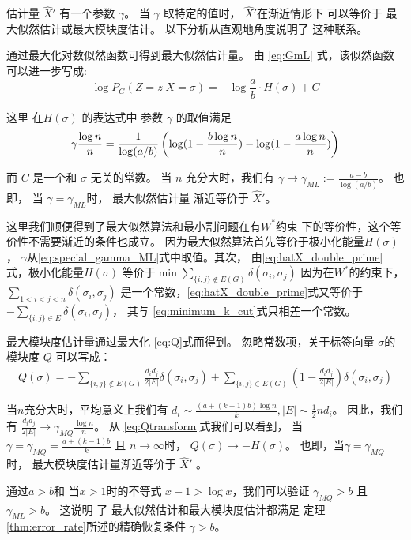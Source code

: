 估计量 $\hat{X}'$ 有一个参数 $\gamma$。
当 $\gamma$ 取特定的值时， $\hat{X}'$在渐近情形下
可以等价于 最大似然估计或最大模块度估计。
以下分析从直观地角度说明了
这种联系。

通过最大化对数似然函数可得到最大似然估计量。
由 \eqref{eq:GmL} 式，该似然函数可以进一步写成:
\begin{equation}\label{eq:PG_energy}
	\log P_G(Z=z|X=\sigma) = -\log\frac{a}{b} \cdot H(\sigma) + C
\end{equation}

这里 在$H(\sigma)$ 的表达式中 参数 $\gamma$ 的取值满足
\begin{equation}\label{eq:special_gamma_ML}
	\gamma \frac{\log n}{n} = \frac{1}{\log(a/b)}
	\left(\log (1-\frac{b \log n}{n}) - \log (1-\frac{a \log n}{n}) \right)	 
\end{equation}

而 $C$ 是一个和 $\sigma$ 无关的常数。
当 $n$ 充分大时，我们有 $\gamma \to \gamma_{ML} := \frac{a-b}{\log(a/b)}$。   
也即，
当 $\gamma = \gamma_{ML}$时，
最大似然估计量 渐近等价于 $\hat{X}'$。

这里我们顺便得到了最大似然算法和最小割问题在有$W^*$约束
下的等价性，这个等价性不需要渐近的条件也成立。
因为最大似然算法首先等价于极小化能量$H(\sigma)$，
$\gamma$从\eqref{eq:special_gamma_ML}式中取值。其次，
由\eqref{eq:hatX_double_prime}式，极小化能量$H(\sigma)$
等价于$\min \sum_{\{i,j\} \not\in E(G) } \delta(\sigma_i, \sigma_j)$
因为在$W^*$的约束下，
$\sum_{1<i<j<n} \delta(\sigma_i, \sigma_j)$
是一个常数，\eqref{eq:hatX_double_prime}式又等价于
$-\sum_{ \{i,j\} \in E} \delta(\sigma_i, \sigma_j)$，
其与 \eqref{eq:minimum_k_cut}式只相差一个常数。


最大模块度估计量通过最大化 \ref{eq:Q}式而得到。
忽略常数项，关于标签向量 $\sigma$的模块度 $Q$
可以写成：
\begin{align}
Q(\sigma) = -\sum_{\{i,j\} \not\in E(G) } \frac{d_i d_j}{2 |E|}\delta(\sigma_i,\sigma_j) 
+ \sum_{\{i,j\} \in E(G) } (1 - \frac{d_i d_j}{2 |E|}) \delta(\sigma_i,\sigma_j)  \label{eq:Qtransform}
\end{align}

当$n$充分大时，平均意义上我们有 $d_i \sim  \frac{(a+(k-1)b)\log n}{k}, |E| \sim \frac{1}{2}n d_i$。
因此，我们有
$\frac{d_id_j}{2|E|} \to \gamma_{MQ} \frac{\log n}{n} $。
从 \eqref{eq:Qtransform}式我们可以看到，
当 $\gamma = \gamma_{MQ} = \frac{a+(k-1)b}{k}$ 且 $n\to \infty$时，
$Q(\sigma) \to -H(\sigma)$。
也即，当$\gamma = \gamma_{MQ}$ 时，
最大模块度估计量渐近等价于
$\hat{X}'$ 。


通过$a>b$和 当$x>1$时的不等式 
 $x-1>\log x $，我们可以验证
  $\gamma_{MQ} >b$ 且  $\gamma_{ML} > b$。
  这说明 了
  最大似然估计和最大模块度估计都满足
  定理\ref{thm:error_rate}所述的精确恢复条件 $\gamma > b $。

